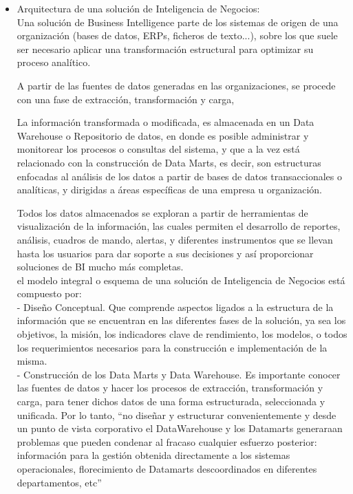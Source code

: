 \documentclass[twoside,twocolumn]{article}
\begin{document}
\begin{itemize}
\item Arquitectura de una solución de Inteligencia de Negocios: \\


Una solución de Business Intelligence parte de los sistemas de origen de una organización
(bases de datos, ERPs, ficheros de texto...), sobre los que suele ser necesario
aplicar una transformación estructural para optimizar su proceso analítico.

A partir de las fuentes de datos generadas en las organizaciones, se procede con
una fase de extracción, transformación y carga,

La información transformada o modificada, es almacenada en un Data Warehouse
o Repositorio de datos, en donde es posible administrar y monitorear los procesos
o consultas del sistema, y que a la vez está relacionado con la construcción de
Data Marts, es decir, son estructuras enfocadas al análisis de los datos a partir de
bases de datos transaccionales o analíticas, y dirigidas a áreas específicas de una
empresa u organización. 

Todos los datos almacenados se exploran a partir de herramientas de
visualización de la información, las cuales permiten el desarrollo de reportes,
análisis, cuadros de mando, alertas, y diferentes instrumentos que se llevan hasta
los usuarios para dar soporte a sus decisiones y así proporcionar soluciones de BI
mucho más completas.\\

el modelo integral o esquema de una solución de
Inteligencia de Negocios está compuesto por: \\


- Diseño Conceptual. Que comprende aspectos ligados a la estructura de la
información que se encuentran en las diferentes fases de la solución, ya sea los
objetivos, la misión, los indicadores clave de rendimiento, los modelos, o todos los
requerimientos necesarios para la construcción e implementación de la misma. \\

- Construcción de los Data Marts y Data Warehouse. Es importante
conocer las fuentes de datos y hacer los procesos de extracción, transformación y
carga, para tener dichos datos de una forma estructurada, seleccionada y
unificada. Por lo tanto, “no diseñar y estructurar convenientemente y desde un
punto de vista corporativo el DataWarehouse y los Datamarts generaraan problemas
que pueden condenar al fracaso cualquier esfuerzo posterior: información para la
gestión obtenida directamente a los sistemas operacionales, florecimiento de
Datamarts descoordinados en diferentes departamentos, etc”  \\


\end{itemize}
\end{document}
